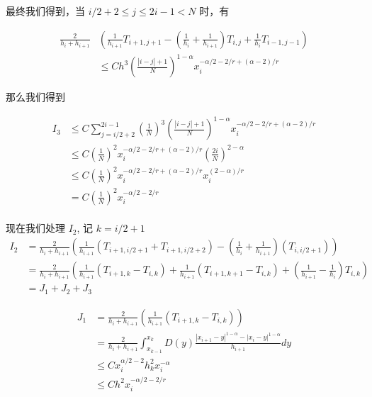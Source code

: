 \documentclass{ctexart}
\begin{document}
最终我们得到，当 \(i/2+2\le j \le 2i-1 < N\) 时，有

\begin{equation}
    \begin{aligned}
        \frac{2}{h_i + h_{i+1}} & \left( \frac{1}{h_{i+1}} T_{i+1, j+1} - (\frac{1}{h_{i}}+\frac{1}{h_{i+1}}) T_{i,j}+  \frac{1}{h_{i}} T_{i-1, j-1} \right) \\
                                & \le C h^3 \left(\frac{|i-j|+1}{N}\right)^{1-\alpha} x_i^{-\alpha/2-2/r+(\alpha-2)/r}
    \end{aligned}
\end{equation}

那么我们得到

\begin{equation}
    \begin{aligned}
        I_3 & \le C \sum_{j=i/2+2}^{2i-1} \left(\frac{1}{N}\right)^3 \left(\frac{|i-j|+1}{N}\right)^{1-\alpha} x_i^{-\alpha/2-2/r+(\alpha-2)/r} \\
            & \le C  \left(\frac{1}{N}\right)^2 x_i^{-\alpha/2-2/r+(\alpha-2)/r} \left(\frac{2i}{N}\right)^{2-\alpha}                           \\
            & \le C \left(\frac{1}{N}\right)^2 x_i^{-\alpha/2-2/r+(\alpha-2)/r} x_i^{(2-\alpha)/r}                                              \\
            & = C \left(\frac{1}{N}\right)^2 x_i^{-\alpha/2-2/r}
    \end{aligned}
\end{equation}
\\


现在我们处理 \(I_2\), 记 \(k = i/2+1\)
\begin{equation}
    \begin{aligned}
        I_2 & = \frac{2}{h_i + h_{i+1}}
        \left( \frac{1}{h_{i+1}} (T_{i+1, i/2+1} +  T_{i+1, i/2+2})
        - (\frac{1}{h_{i}}+\frac{1}{h_{i+1}}) (T_{i,i/2+1}) \right)                                          \\
            & = \frac{2}{h_i + h_{i+1}}
        \left( \frac{1}{h_{i+1}} (T_{i+1, k} -  T_{i, k})
        + \frac{1}{h_{i+1}} (T_{i+1, k+1} - T_{i,k}) + (\frac{1}{h_{i+1}} - \frac{1}{h_{i}}) T_{i,k} \right) \\
            & = J_1 + J_2 + J_3
    \end{aligned}
\end{equation}


\begin{equation}
    \begin{aligned}
        J_1 & = \frac{2}{h_i + h_{i+1}} \left( \frac{1}{h_{i+1}} (T_{i+1, k} -  T_{i, k}) \right)                                \\
            & = \frac{2}{h_i + h_{i+1}} \int_{x_{k-1}}^{x_k} D(y) \frac{|x_{i+1}-y|^{1-\alpha} - |x_i-y|^{1-\alpha}}{h_{i+1}} dy \\
            & \le C x_i^{\alpha/2-2} h_k^2 x_i^{-\alpha}                                                                         \\
            & \le C h^2 x_i^{-\alpha/2-2/r}
    \end{aligned}
\end{equation}
\end{document}
